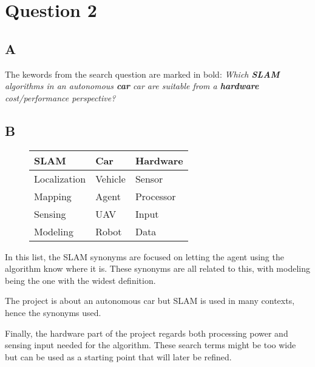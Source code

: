 \documentclass[a4paper, 12pt]{article}
\begin{document}
\section*{Question 2}
\subsection*{A}
The kewords from the search question are marked in bold: \linebreak
\textit{Which \textbf{SLAM} algorithms in an autonomous \textbf{car} car are suitable from a
\textbf{hardware} cost/performance perspective?} \linebreak
\subsection*{B}
\begin{figure}[H]
    \centering
    \begin{tabular}{l | l | l}
        \textbf{SLAM} & \textbf{Car} & \textbf{Hardware} \\
        \hline
        Localization & Vehicle & Sensor \\
        \hline
        Mapping & Agent & Processor \\
        \hline
        Sensing & UAV & Input \\
        \hline
        Modeling & Robot & Data \\
    \end{tabular}
\end{figure}
In this list, the SLAM synonyms are focused on letting the agent using the algorithm know
where it is. These synonyms are all related to this, with modeling being the 
one with the widest definition. 

The project is about an autonomous car but SLAM is used in many contexts, hence
the synonyms used.

Finally, the hardware part of the project regards both processing power and sensing
input needed for the algorithm. These search terms might be too wide but can be 
used as a starting point that will later be refined.
\end{document}
